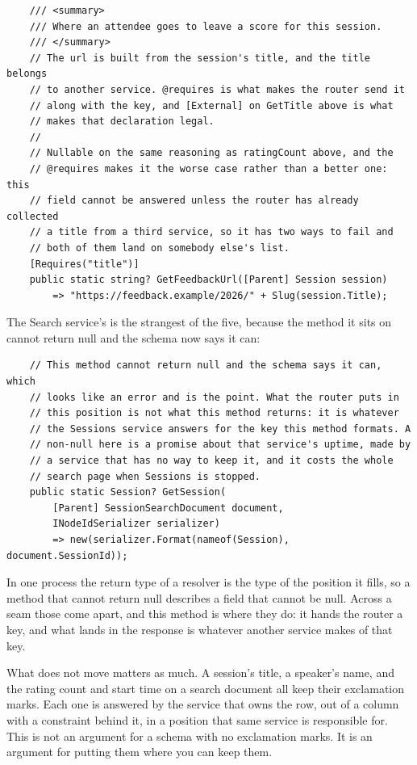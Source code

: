 \begin{verbatim}
    /// <summary>
    /// Where an attendee goes to leave a score for this session.
    /// </summary>
    // The url is built from the session's title, and the title belongs
    // to another service. @requires is what makes the router send it
    // along with the key, and [External] on GetTitle above is what
    // makes that declaration legal.
    //
    // Nullable on the same reasoning as ratingCount above, and the
    // @requires makes it the worse case rather than a better one: this
    // field cannot be answered unless the router has already collected
    // a title from a third service, so it has two ways to fail and
    // both of them land on somebody else's list.
    [Requires("title")]
    public static string? GetFeedbackUrl([Parent] Session session)
        => "https://feedback.example/2026/" + Slug(session.Title);
\end{verbatim}

%
The Search service's is the strangest of the five, because the method it sits
on cannot return null and the schema now says it can:

\begin{verbatim}
    // This method cannot return null and the schema says it can, which
    // looks like an error and is the point. What the router puts in
    // this position is not what this method returns: it is whatever
    // the Sessions service answers for the key this method formats. A
    // non-null here is a promise about that service's uptime, made by
    // a service that has no way to keep it, and it costs the whole
    // search page when Sessions is stopped.
    public static Session? GetSession(
        [Parent] SessionSearchDocument document,
        INodeIdSerializer serializer)
        => new(serializer.Format(nameof(Session), document.SessionId));
\end{verbatim}

%
In one process the return type of a resolver is the type of the position it
fills, so a method that cannot return null describes a field that cannot be
null. Across a seam those come apart, and this method is where they do: it
hands the router a key, and what lands in the response is whatever another
service makes of that key.

%
What does not move matters as much. A session's title, a speaker's name, and
the rating count and start time on a search document all keep their exclamation
marks. Each one is answered by the service that owns the row, out of a column
with a constraint behind it, in a position that same service is responsible
for. This is not an argument for a schema with no exclamation marks. It is an
argument for putting them where you can keep them.

